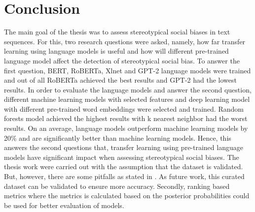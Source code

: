 \chapter{Conclusion}
The main goal of the thesis was to assess stereotypical social biases in text sequences. For this, two research questions were asked, namely, how far transfer learning using language models is useful and how will different pre-trained language model affect the detection of stereotypical social bias. To answer the first question, BERT, RoBERTa, Xlnet and GPT-2 language models were trained and out of all RoBERTa achieved the best results and GPT-2 had the lowest results. In order to evaluate the language models and answer the second question, different machine learning models with selected features and deep learning model with different pre-trained word embeddings were selected and trained. Random forests model achieved the highest results with k nearest neighbor had the worst results. On an average, language models outperform machine learning models by 20\% and are significantly better than machine learning models. Hence, this answers the second questions that, transfer learning using pre-trained language models have significant impact when assessing stereotypical social biases. The thesis work were carried out with the assumption that the dataset is validated. But, however, there are some pitfalls as stated in \cite{blodgett2021stereotyping}. As future work, this curated dataset can be validated to ensure more accuracy. Secondly, ranking based metrics where the metrics is calculated based on the posterior probabilities could be used for better evaluation of models. 

